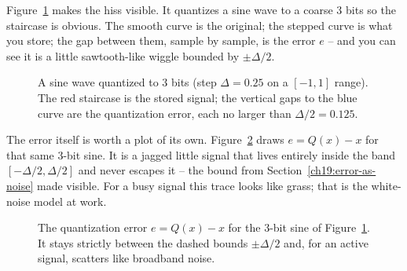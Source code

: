 Figure~\ref{ch19:fig-quantsine} makes the hiss visible. It quantizes a sine wave to a coarse
3 bits so the staircase is obvious. The smooth curve is the original; the stepped curve is what
you store; the gap between them, sample by sample, is the error $e$ -- and you can see it is a
little sawtooth-like wiggle bounded by $\pm\Delta/2$.

\begin{figure}[H]
\centering
{}
\caption{A sine wave quantized to 3 bits (step $\Delta=0.25$ on a $[-1,1]$ range). The red
staircase is the stored signal; the vertical gaps to the blue curve are the quantization error,
each no larger than $\Delta/2=0.125$.}
\label{ch19:fig-quantsine}
\end{figure}

The error itself is worth a plot of its own. Figure~\ref{ch19:fig-quanterror} draws
$e = Q(x) - x$ for that same 3-bit sine. It is a jagged little signal that lives entirely
inside the band $[-\Delta/2, \Delta/2]$ and never escapes it -- the bound from
Section~\ref{ch19:error-as-noise} made visible. For a busy signal this trace looks like grass;
that is the white-noise model at work.

\begin{figure}[H]
\centering
{}
\caption{The quantization error $e = Q(x) - x$ for the 3-bit sine of
Figure~\ref{ch19:fig-quantsine}. It stays strictly between the dashed bounds $\pm\Delta/2$ and,
for an active signal, scatters like broadband noise.}
\label{ch19:fig-quanterror}
\end{figure}

